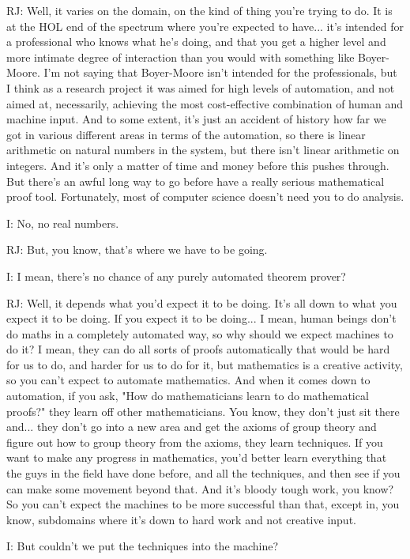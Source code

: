 \documentclass[10pt,titlepage]{book}
\begin{document}
RJ: Well, it varies on the domain, on the kind of thing you're trying to do. It is at the HOL end of the spectrum where you're expected to have... it's intended for a professional who knows what he's doing, and that you get a higher level and more intimate degree of interaction than you would with something like Boyer-Moore. I'm not saying that Boyer-Moore isn't intended for the professionals, but I think as a research project it was aimed for high levels of automation, and not aimed at, necessarily, achieving the most cost-effective combination of human and machine input. And to some extent, it's just an accident of history how far we got in various different areas in terms of the automation, so there is linear arithmetic on natural numbers in the system, but there isn't linear arithmetic on integers. And it's only a matter of time and money before this pushes through. But there's an awful long way to go before have a really serious mathematical proof tool. Fortunately, most of computer science doesn't need you to do analysis.

I: No, no real numbers.

RJ: But, you know, that's where we have to be going.

I: I mean, there's no chance of any purely automated theorem prover?

RJ: Well, it depends what you'd expect it to be doing. It's all down to what you expect it to be doing. If you expect it to be doing... I mean, human beings don't do maths in a completely automated way, so why should we expect machines to do it? I mean, they can do all sorts of proofs automatically that would be hard for us to do, and harder for us to do for	it, but mathematics is a creative activity, so you can't expect to automate mathematics. And when it comes down to automation, if you ask, "How do mathematicians learn to do mathematical proofs?" they learn off other mathematicians. You know, they don't just sit there and... they don't go into a new area and get the axioms of group theory and figure out how to group theory from the axioms, they learn techniques. If you want to make any progress in mathematics, you'd better learn everything that the guys in the field have done before, and all the techniques, and then see if you can make some movement beyond that. And it's bloody tough work, you know? So you can't expect the machines to be more successful than that, except in, you know, subdomains where it's down to hard work and not creative input.

I: But couldn't we put the techniques into the machine?
\end{document}
